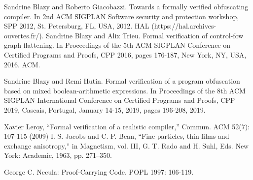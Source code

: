 \documentclass[compsoc,conference,a4paper,10pt,times]{IEEEtran}
\begin{document}
\begin{thebibliography}{00}
 Sandrine Blazy and Roberto Giacobazzi. Towards a formally verified obfuscating compiler. In 2nd ACM SIGPLAN Software security and protection
workshop, SPP 2012, St. Petersburg, FL, USA, 2012. HAL (https://hal.archives-ouvertes.fr/).
 Sandrine Blazy and Alix Trieu. Formal verification of control-fow graph flattening. In Proceedings of the 5th ACM SIGPLAN Conference on Certified
Programs and Proofs, CPP 2016, pages 176-187, New York, NY, USA, 2016. ACM.

 Sandrine Blazy and Remi Hutin. Formal verification of a program obfuscation based on mixed boolean-arithmetic expressions. In Proceedings of the 8th ACM SIGPLAN International Conference on Certified Programs and Proofs, CPP 2019, Cascais, Portugal, January 14-15, 2019, pages 196-208, 2019.

 	Xavier Leroy, ``Formal verification of a realistic compiler,'' Commun. ACM 52(7): 107-115 (2009)
 I. S. Jacobs and C. P. Bean, ``Fine particles, thin films and exchange anisotropy,'' in Magnetism, vol. III, G. T. Rado and H. Suhl, Eds. New York: Academic, 1963, pp. 271--350.

 George C. Necula: Proof-Carrying Code. POPL 1997: 106-119. 


\end{thebibliography}
\end{document}
